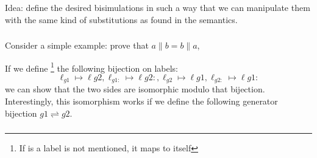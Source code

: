 Idea: define the desired bisimulations in such a way that
we can manipulate them with the same kind of substitutions
as found in the semantics.

\subsubsection{}

Consider a simple example: prove that $a \parallel b = b \parallel a$,


If we define%
\footnote{If is a label is not mentioned, it maps to itself}
the following bijection on labels:
\[
  \ell_{g1} \mapsto \ell{g2}
, \ell_{g1:} \mapsto \ell{g2:}
, \ell_{g2} \mapsto \ell{g1}
, \ell_{g2:} \mapsto \ell{g1:}
\]
we can show that the two sides are isomorphic modulo that bijection.
Interestingly, this isomorphism works if we define the following
generator bijection $g1 \rightleftharpoons g2$.

\subsubsection{}

